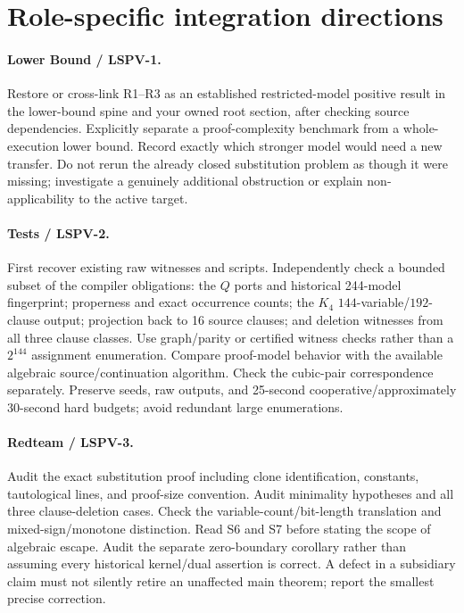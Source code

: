 \documentclass[11pt]{article}
\begin{document}
\section{Role-specific integration directions}
\paragraph{Lower Bound / LSPV-1.}
Restore or cross-link R1--R3 as an established restricted-model positive result in the lower-bound spine and your owned root section, after checking source dependencies. Explicitly separate a proof-complexity benchmark from a whole-execution lower bound. Record exactly which stronger model would need a new transfer. Do not rerun the already closed substitution problem as though it were missing; investigate a genuinely additional obstruction or explain non-applicability to the active target.

\paragraph{Tests / LSPV-2.}
First recover existing raw witnesses and scripts. Independently check a bounded subset of the compiler obligations: the $Q$ ports and historical 244-model fingerprint; properness and exact occurrence counts; the $K_4$ $144$-variable/$192$-clause output; projection back to 16 source clauses; and deletion witnesses from all three clause classes. Use graph/parity or certified witness checks rather than a $2^{144}$ assignment enumeration. Compare proof-model behavior with the available algebraic source/continuation algorithm. Check the cubic-pair correspondence separately. Preserve seeds, raw outputs, and 25-second cooperative/approximately 30-second hard budgets; avoid redundant large enumerations.

\paragraph{Redteam / LSPV-3.}
Audit the exact substitution proof including clone identification, constants, tautological lines, and proof-size convention. Audit minimality hypotheses and all three clause-deletion cases. Check the variable-count/bit-length translation and mixed-sign/monotone distinction. Read S6 and S7 before stating the scope of algebraic escape. Audit the separate zero-boundary corollary rather than assuming every historical kernel/dual assertion is correct. A defect in a subsidiary claim must not silently retire an unaffected main theorem; report the smallest precise correction.
\end{document}
